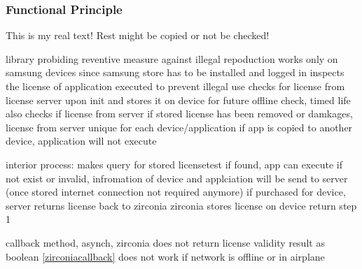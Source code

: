 \subsubsection{Functional Principle} \label{subsection:license-samsung-functional}
This is my real text! Rest might be copied or not be checked!

%
library probiding reventive measure against illegal repoduction
works only on samsung devices since samsung store has to be installed and logged in
inspects the license of application executed to prevent illegal use
checks for license from license server upon init and stores it on device for future offline check, timed life
also checks if license from server if stored license has been removed or damkages, license from server unique for each device/application
if app is copied to another device, application will not execute

interior process:
makes query for stored licensetest
if found, app can execute
if not exist or invalid, infromation of device and applciation will be send to server (once stored internet connection not required anymore)
if purchased for device, server returns license back to zirconia
zirconia stores license on device
return step 1

callback method, asynch, zirconia does not return license validity result as boolean \ref{zirconiacallback}
does not work if network is offline or in airplane

\cite{samsungZirconia}
%
